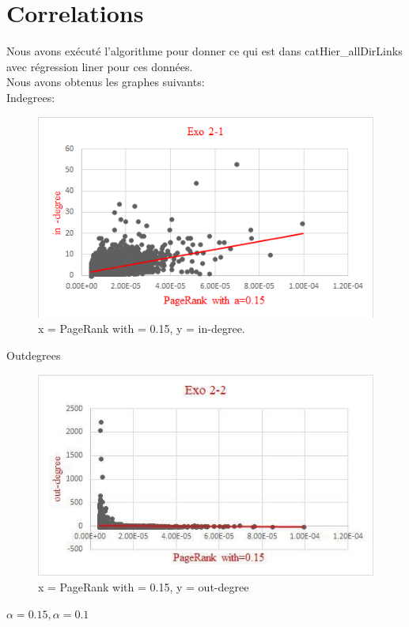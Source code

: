 \documentclass[a4paper,10pt]{report}
\begin{document}
\section{Correlations}
Nous avons exécuté l’algorithme pour donner ce qui est dans catHier\_allDirLinks avec régression liner pour ces données.\\
Nous avons obtenus les graphes suivants:
\\
Indegrees:
\\
\begin{figure}[H]
  \caption{x = PageRank with  = 0.15, y = in-degree.}
  \centering
    \includegraphics{./Datas/pageRank/pageRankAlpha015Indegree.png}    
\end{figure}
Outdegrees
\begin{figure}[H]
 \centering
  \caption{x = PageRank with  = 0.15, y = out-degree}
    \includegraphics{./Datas/pageRank/pageRankAlpha015Outdegree.jpg}
\end{figure}
$\alpha = 0.15, \alpha = 0.1$
\end{document}
